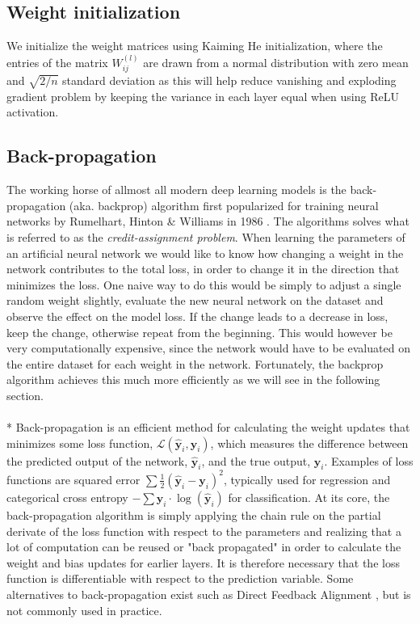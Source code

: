 \documentclass[a4paper,11pt]{article} %
\begin{document}
\subsection{Weight initialization}
We initialize the weight matrices using Kaiming He initialization, where the entries of the matrix $W^{(l)}_{ij}$ are drawn from a normal distribution with zero mean and $\sqrt{2/n}$ standard deviation as this will help reduce vanishing and exploding gradient problem by keeping the variance in each layer equal when using ReLU activation. \cite{he2015delving}


\subsection{Back-propagation}
\label{sec:backprop}
The working horse of allmost all modern deep learning models is the back-propagation (aka. backprop) algorithm first popularized for training neural networks by Rumelhart, Hinton \& Williams in 1986 \cite{rumelhart1986learning}. The algorithms solves what is referred to as the \textit{credit-assignment problem}. When learning the parameters of an artificial neural network we would like to know how changing a weight in the network contributes to the total loss, in order to change it in the direction that minimizes the loss. One naive way to do this would be simply to adjust a single random weight slightly, evaluate the new neural network on the dataset and observe the effect on the model loss. If the change leads to a decrease in loss, keep the change, otherwise repeat from the beginning. This would however be very computationally expensive, since the network would have to be evaluated on the entire dataset for each weight in the network. Fortunately, the backprop algorithm achieves this much more efficiently as we will see in the following section. \\
\\*
Back-propagation is an efficient method for calculating the weight updates that minimizes some loss function, $\mathcal{L}(\hat{\mathbf{y}}_i, \mathbf{y}_i)$, which measures the difference between the predicted output of the network, $\hat{\mathbf{y}}_i$, and the true output, $\mathbf{y}_i$. Examples of loss functions are squared error $\sum{\frac{1}{2}(\hat{\mathbf{y}}_i - \mathbf{y}_i)^2}$, typically used for regression and categorical cross entropy $-\sum{\mathbf{y}_i \cdot \log(\hat{\mathbf{y}}_i)}$ for classification. At its core, the back-propagation algorithm is simply applying the chain rule on the partial derivate of the loss function with respect to the parameters and realizing that a lot of computation can be reused or "back propagated" in order to calculate the weight and bias updates for earlier layers. It is therefore necessary that the loss function is differentiable with respect to the prediction variable. Some alternatives to back-propagation exist such as Direct Feedback Alignment \cite{noekland2016direct}, but is not commonly used in practice.  
\end{document}
